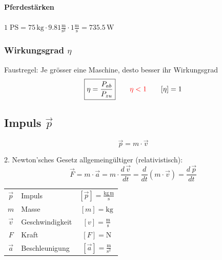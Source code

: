 			\textbf{Pferdestärken} \\
				\\
				$1 \; \mathrm{PS} = 75 \, \mathrm{kg} \cdot 9.81 \mathrm{\frac{m}{s^2}} \cdot 1 \mathrm{\frac{m}{s}} = 735.5 \, \mathrm{W}$ \\

		\subsubsection{Wirkungsgrad $\eta$}	
			Faustregel: Je grösser eine Maschine, desto besser ihr Wirkungsgrad \\
			
			$$ \boxed{ \eta = \frac{P_{ab}}{P_{zu}} } \qquad \textcolor{red}{\eta < 1} \qquad [\eta] = 1 $$

	\subsection{Impuls $\vec{p}$}
	
		$$ \boxed{ \vec{p} = m \cdot \vec{v} }$$ 
		
		2. Newton'sches Gesetz allgemeingültiger (relativistisch): \\
		
		$$ \boxed{ \vec{F} = m \cdot \vec{a} = m \cdot \frac{d \, \vec{v}}{dt} = \frac{d}{dt} (m \cdot \vec{v}) = \frac{d \, \vec{p}}{dt} } $$ 
		
		\begin{tabular}{c l c}
			$\vec{p}$ & Impuls & $[\vec{p}] = \mathrm{\frac{kg  \, m}{s}}$ \\
			$m$       & Masse & $[m] = \mathrm{kg}$ \\
			$\vec{v}$ & Geschwindigkeit & $[v] = \mathrm{\frac{m}{s}}$ \\
			$F$       & Kraft & $[F] = \mathrm{N}$ \\
			$\vec{a}$ & Beschleunigung & $[\vec{a}] = \mathrm{\frac{m}{s^2}}$ \\
		\end{tabular}

